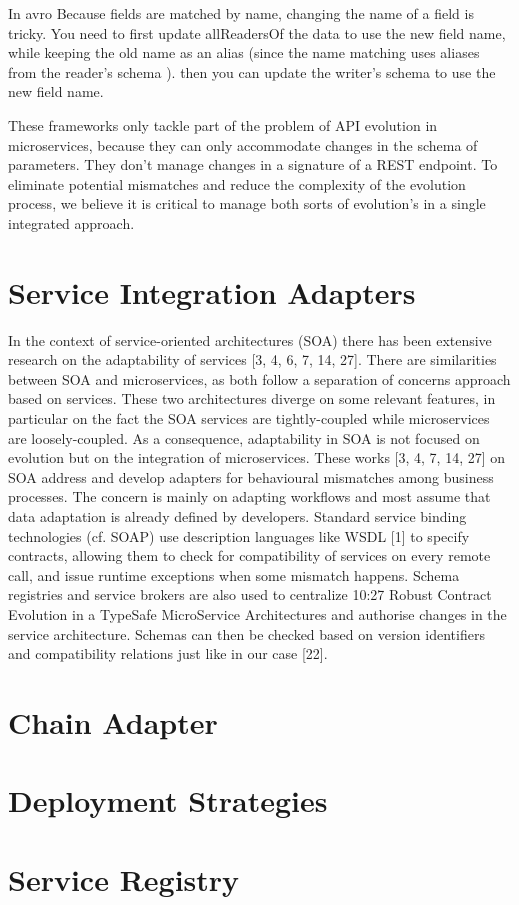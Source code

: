 In avro
Because fields are matched by name, changing the name of a field is tricky. You need to first update allReadersOf the data to use the new field name, while keeping the old name as an alias (since the name matching uses aliases from the reader's schema ). then you can update the writer's schema to use the new field name.

These frameworks only tackle part of the problem of API evolution in microservices,
because they can only accommodate changes in the schema of parameters. They don't manage changes in a signature of a REST endpoint.
To eliminate potential mismatches and reduce the complexity of the evolution process, we believe it is critical to manage both sorts of evolution's in a single integrated approach.

\section{Service Integration Adapters} %
\label{sec:service_integration_adapters}

In the context of service-oriented architectures (SOA) there has been extensive
research on the adaptability of services [3, 4, 6, 7, 14, 27]. There are similarities
between SOA and microservices, as both follow a separation of concerns approach
based on services. These two architectures diverge on some relevant features, in
particular on the fact the SOA services are tightly-coupled while microservices are
loosely-coupled. As a consequence, adaptability in SOA is not focused on evolution
but on the integration of microservices. These works [3, 4, 7, 14, 27] on SOA address
and develop adapters for behavioural mismatches among business processes. The
concern is mainly on adapting workflows and most assume that data adaptation is
already defined by developers. Standard service binding technologies (cf. SOAP) use
description languages like WSDL [1] to specify contracts, allowing them to check for
compatibility of services on every remote call, and issue runtime exceptions when some
mismatch happens. Schema registries and service brokers are also used to centralize
10:27
Robust Contract Evolution in a TypeSafe MicroService Architectures
and authorise changes in the service architecture. Schemas can then be checked based
on version identifiers and compatibility relations just like in our case [22].

\section{Chain Adapter} %
\label{sec:chain_adapter}

\section{Deployment Strategies} %
\label{sec:deployment_strategies}

\section{Service Registry} %
\label{sec:service_registry}
